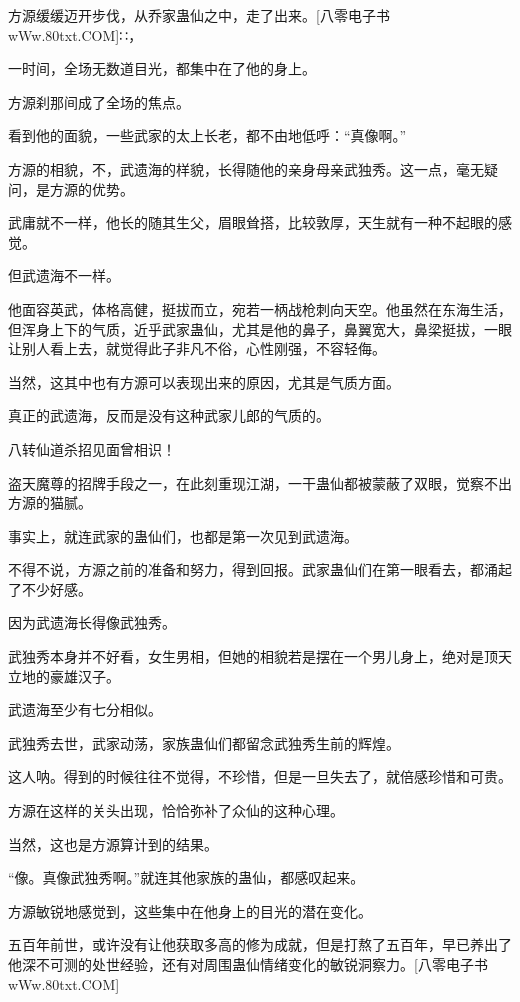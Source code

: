 
\begin{this_body}

方源缓缓迈开步伐，从乔家蛊仙之中，走了出来。[八零电子书wWw.80txt.COM]∷，

一时间，全场无数道目光，都集中在了他的身上。

方源刹那间成了全场的焦点。

看到他的面貌，一些武家的太上长老，都不由地低呼：“真像啊。”

方源的相貌，不，武遗海的样貌，长得随他的亲身母亲武独秀。这一点，毫无疑问，是方源的优势。

武庸就不一样，他长的随其生父，眉眼耸搭，比较敦厚，天生就有一种不起眼的感觉。

但武遗海不一样。

他面容英武，体格高健，挺拔而立，宛若一柄战枪刺向天空。他虽然在东海生活，但浑身上下的气质，近乎武家蛊仙，尤其是他的鼻子，鼻翼宽大，鼻梁挺拔，一眼让别人看上去，就觉得此子非凡不俗，心性刚强，不容轻侮。

当然，这其中也有方源可以表现出来的原因，尤其是气质方面。

真正的武遗海，反而是没有这种武家儿郎的气质的。

八转仙道杀招见面曾相识！

盗天魔尊的招牌手段之一，在此刻重现江湖，一干蛊仙都被蒙蔽了双眼，觉察不出方源的猫腻。

事实上，就连武家的蛊仙们，也都是第一次见到武遗海。

不得不说，方源之前的准备和努力，得到回报。武家蛊仙们在第一眼看去，都涌起了不少好感。

因为武遗海长得像武独秀。

武独秀本身并不好看，女生男相，但她的相貌若是摆在一个男儿身上，绝对是顶天立地的豪雄汉子。

武遗海至少有七分相似。

武独秀去世，武家动荡，家族蛊仙们都留念武独秀生前的辉煌。

这人呐。得到的时候往往不觉得，不珍惜，但是一旦失去了，就倍感珍惜和可贵。

方源在这样的关头出现，恰恰弥补了众仙的这种心理。

当然，这也是方源算计到的结果。

“像。真像武独秀啊。”就连其他家族的蛊仙，都感叹起来。

方源敏锐地感觉到，这些集中在他身上的目光的潜在变化。

五百年前世，或许没有让他获取多高的修为成就，但是打熬了五百年，早已养出了他深不可测的处世经验，还有对周围蛊仙情绪变化的敏锐洞察力。[八零电子书wWw.80txt.COM]


\end{this_body}
